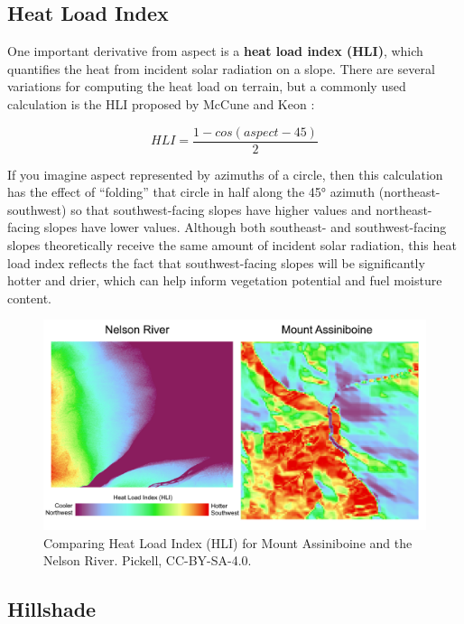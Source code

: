 \documentclass[
]{book}
\begin{document}
\subsection{Heat Load Index}\label{heat-load-index}

One important derivative from aspect is a \textbf{heat load index (HLI)}, which quantifies the heat from incident solar radiation on a slope. There are several variations for computing the heat load on terrain, but a commonly used calculation is the HLI proposed by McCune and Keon \citep{mccune_equations_2002}:

\[
HLI=\frac{1-cos(aspect-45)}{2}
\]

If you imagine aspect represented by azimuths of a circle, then this calculation has the effect of ``folding'' that circle in half along the 45° azimuth (northeast-southwest) so that southwest-facing slopes have higher values and northeast-facing slopes have lower values. Although both southeast- and southwest-facing slopes theoretically receive the same amount of incident solar radiation, this heat load index reflects the fact that southwest-facing slopes will be significantly hotter and drier, which can help inform vegetation potential and fuel moisture content.

\begin{figure}
\includegraphics[width=0.75\linewidth]{images/09-mount-assiniboine-nelson-river-heat-load-index} \caption{Comparing Heat Load Index (HLI) for Mount Assiniboine and the Nelson River. Pickell, CC-BY-SA-4.0.}\label{fig:9-mount-assiniboine-nelson-river-heat-load-index}
\end{figure}

\subsection{Hillshade}\label{hillshade}
\end{document}
